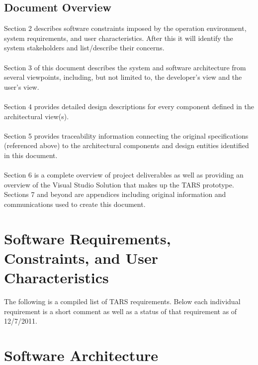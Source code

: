 \documentclass[letterpaper]{article}
\begin{document}
\subsection{\bfseries{Document Overview}}
Section 2 describes software constraints imposed by the operation environment, system requirements, and user characteristics. After this it will identify the system stakeholders and list/describe their concerns.  \\
\\
Section 3 of this document describes the system and software
architecture from several viewpoints, including, but not limited to,
the developer{\textquoteright}s view and the user{\textquoteright}s
view.\\
\\
Section 4 provides detailed design descriptions for every component
defined in the architectural view(s). \\
\\
Section 5 provides traceability information connecting the original specifications
(referenced above) to the architectural components and design entities identified in this document.\\
\\
Section 6 is a complete overview of project deliverables as well as providing an overview of the Visual Studio Solution that makes up the TARS prototype.
\\
Sections 7 and beyond are appendices including original information and communications used to create this document.

\section{\bfseries{Software Requirements, Constraints, and User Characteristics}}
The following is a compiled list of TARS requirements. Below each individual requirement is a short comment as well as a status of that requirement as of 12/7/2011.

\section{Software Architecture}
\end{document}
